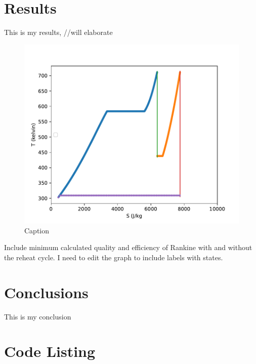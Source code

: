 \documentclass{article}
\begin{document}
\section{Results}

This is my results, //will elaborate
\begin{figure}
    \centering
    \includegraphics{Fig_test.pdf}
    \caption{Caption}
    
    \label{fig:my_label}
\end{figure}

\FloatBarrier

Include minimum calculated quality and efficiency of Rankine with and without the reheat cycle. I need to edit the graph to include labels with states.

\section{Conclusions}

This is my conclusion

\appendix

\FloatBarrier %





\section*{Code Listing}


\end{document}
